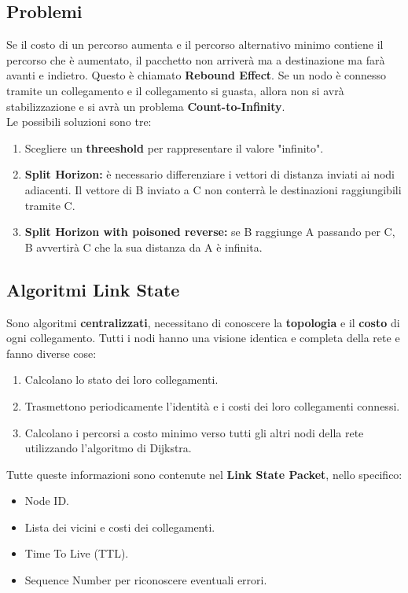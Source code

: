 \subsection{Problemi}
Se il costo di un percorso aumenta e il percorso alternativo minimo contiene il percorso che è aumentato, il pacchetto non arriverà ma a destinazione ma farà avanti e indietro. Questo è chiamato \textbf{Rebound Effect}. Se un nodo è connesso tramite un collegamento e il collegamento si guasta, allora non si avrà stabilizzazione e si avrà un problema \textbf{Count-to-Infinity}.
\\
Le possibili soluzioni sono tre:
\begin{enumerate}
    \item Scegliere un \textbf{threeshold} per rappresentare il valore "infinito".
    \item \textbf{Split Horizon:} è necessario differenziare i vettori di distanza inviati ai nodi adiacenti. Il vettore di B inviato a C non conterrà le destinazioni raggiungibili tramite C.
    \item \textbf{Split Horizon with poisoned reverse:} se B raggiunge A passando per C, B avvertirà C che la sua distanza da A è infinita.
\end{enumerate}

\subsection{Algoritmi Link State}
Sono algoritmi \textbf{centralizzati}, necessitano di conoscere la \textbf{topologia} e il \textbf{costo} di ogni collegamento. Tutti i nodi hanno una visione identica e completa della rete e fanno diverse cose:
\begin{enumerate}
    \item Calcolano lo stato dei loro collegamenti.
    \item Trasmettono periodicamente l'identità e i costi dei loro collegamenti connessi.
    \item Calcolano i percorsi a costo minimo verso tutti gli altri nodi della rete utilizzando l'algoritmo di Dĳkstra.
\end{enumerate}
Tutte queste informazioni sono contenute nel \textbf{Link State Packet}, nello specifico: 
\begin{itemize}
    \item Node ID.
    \item Lista dei vicini e costi dei collegamenti.
    \item Time To Live (TTL).
    \item Sequence Number per riconoscere eventuali errori.
\end{itemize}

